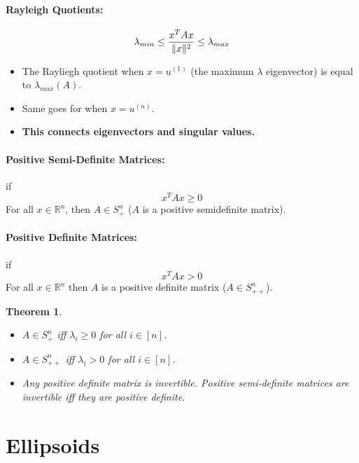 \documentclass[a4paper,12pt]{report}
\DeclarePairedDelimiter\norm{\lVert}{\rVert}%
\def\reals{\mathbb{R}}
\newtheorem{theorem}{Theorem}
\begin{document}
\paragraph{Rayleigh Quotients: } 
\begin{equation}
\lambda_{min} \leq \frac{x^T A x}{\norm{x}^2} \leq \lambda_{max}
\end{equation}

\begin{itemize}
\item The Rayliegh quotient when $x = u^{(1)}$ (the maximum $\lambda$ eigenvector) is equal to $\lambda_{max}(A)$.
\item Same goes for when $x = u^{(n)}$.
\item \textbf{This connects eigenvectors and singular values.} 
\end{itemize}

\paragraph{Positive Semi-Definite Matrices: } if \begin{equation}
x^T A x \geq 0
\end{equation}
For all $x\in \reals^n$, then $A\in S^n_+$ ($A$ is a positive semidefinite matrix).

\paragraph{Positive Definite Matrices: } if \begin{equation}
x^T A x > 0
\end{equation}
For all $x\in \reals^n$ then $A$ is a positive definite matrix ($A\in S^n_{++}$).

\begin{theorem}
\begin{itemize}
\item $A\in S^n_+$ iff $\lambda_i \geq 0$ for all $i\in [n]$.
\item $A\in S^n_{++}$ iff $\lambda_i > 0$ for all $i \in [n]$.
\item Any positive definite matrix is invertible. \textit{Positive semi-definite matrices are invertible iff they are positive definite}. 
\end{itemize}
\end{theorem}

\section{Ellipsoids}
\end{document}
